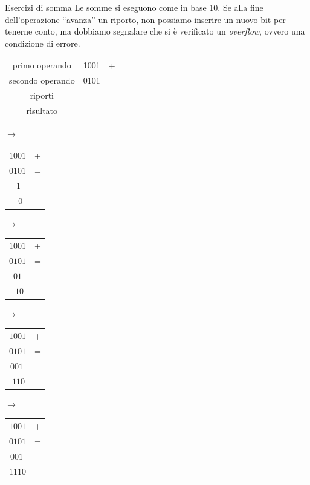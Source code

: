 \documentclass[handout]{beamer}
\begin{document}
\begin{frame}{Esercizi di somma}
Le somme si eseguono come in base 10. Se alla fine dell'operazione ``avanza'' un riporto, \alert{non possiamo} inserire un nuovo bit per tenerne conto, ma dobbiamo segnalare che si è verificato un \emph{overflow}, ovvero una condizione di errore.

\begin{tabular}{cc|c}
	primo operando   & 1001 & + \\
	secondo operando & 0101 & = \\
	riporti          &      &  \\
	\hline
	risultato        &   & \\
\end{tabular}
$\rightarrow$
\begin{tabular}{c|c}
	$1001$ & + \\
	$0101$ & = \\
	$\ \ 1\ $ &   \\
	\hline
	$\ \ \ 0$&  \\
\end{tabular}
$\rightarrow$
\begin{tabular}{c|c}
	$1001$ & + \\
	$0101$ & = \\
	$\ 01\ $&   \\
	\hline
	$\ \ 10$&  \\
\end{tabular}

$\rightarrow$
\begin{tabular}{c|c}
	$1001$ & + \\
	$0101$ & = \\
	$001\ $&   \\
	\hline
	$\ 110$&  \\
\end{tabular}
$\rightarrow$
\begin{tabular}{c|c}
	$1001$ & + \\
	$0101$ & = \\
	$001\ $&   \\
	\hline
	$1110$&  \\
\end{tabular}
\end{frame}
\end{document}
